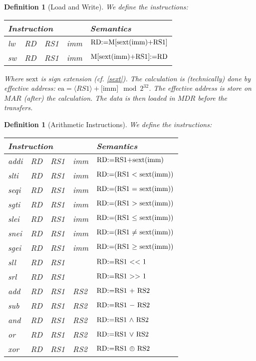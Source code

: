 \documentclass[12pt]{article}
\let\aand\wedge
\let\oor\vee
\renewcommand{\arraystretch}{0.8}
\newcommand{\repr}[1]{\langle{#1}\rangle}
\newcommand{\trepr}[1]{\big[{#1}\big]}
\newtheorem{definition}[theorem]{Definition}
\begin{document}
\renewcommand{\arraystretch}{1.1}

\begin{definition}[Load and Write]
  We define the instructions:
  \begin{table}[H]
    \centering
      \begin{tabular}{llll|l}
      \multicolumn{4}{l|}{Instruction} & Semantics \\ \hline
      lw & RD & RS1 & imm & $\textup{RD:=M[\text{sext}(\text{imm})+RS1]}$\\
      sw & RD & RS1 & imm & $\textup{M[\text{sext}(\text{imm})+RS1]:=RD}$
    \end{tabular}
  \end{table}
  \noindent Where $\text{sext}$ is sign extension (cf. \ref{sext}). The calculation is (technically) done by effective address: $\text{ea}=\repr{RS1}+\trepr{\text{imm}}\mod 2^{32}$. The effective address is store on $MAR$ (after) the calculation. The data is then loaded in $MDR$ before the transfers.
\end{definition}

\begin{definition}[Arithmetic Instructions]
  We define the instructions:
  
  \begin{table}[H]
    \centering
      \begin{tabular}{llll|l}
      \multicolumn{4}{l|}{Instruction} & Semantics \\ \hline
      addi & RD & RS1 & imm & $\textup{RD:=RS1+\text{sext}(\text{imm})}$\\
      slti & RD & RS1 & imm & $\textup{RD:=(RS1 $<$ \text{sext}(\text{imm}))}$\\
      seqi & RD & RS1 & imm & $\textup{RD:=(RS1 $=$ \text{sext}(\text{imm}))}$\\
      sgti & RD & RS1 & imm & $\textup{RD:=(RS1 $>$ \text{sext}(\text{imm}))}$\\
      slei & RD & RS1 & imm & $\textup{RD:=(RS1 $\leq$ \text{sext}(\text{imm}))}$\\
      snei & RD & RS1 & imm & $\textup{RD:=(RS1 $\neq$ \text{sext}(\text{imm}))}$\\
      sgei & RD & RS1 & imm & $\textup{RD:=(RS1 $\geq$ \text{sext}(\text{imm}))}$\\ \hline
      sll & RD & RS1 &  & $\textup{RD:=RS1 $<<$ 1}$\\
      srl & RD & RS1 &  & $\textup{RD:=RS1 $>>$ 1}$\\
      add & RD & RS1 & RS2 & $\textup{RD:=RS1 $+$ RS2}$\\
      sub & RD & RS1 & RS2 & $\textup{RD:=RS1 $-$ RS2}$\\
      and & RD & RS1 & RS2 & $\textup{RD:=RS1 $\aand$ RS2}$\\
      or & RD & RS1 & RS2 & $\textup{RD:=RS1 $\oor$ RS2}$\\
      xor & RD & RS1 & RS2 & $\textup{RD:=RS1 $\oplus$ RS2}$
    \end{tabular}
  \end{table}
\end{definition}
\end{document}
